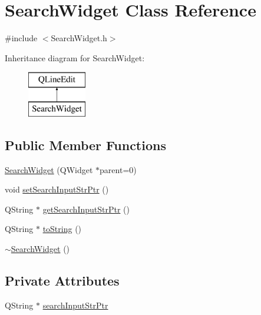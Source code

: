 \hypertarget{class_search_widget}{\section{Search\-Widget Class Reference}
\label{class_search_widget}
}


{\ttfamily \#include $<$Search\-Widget.\-h$>$}

Inheritance diagram for Search\-Widget\-:\begin{figure}[H]
\begin{center}
\leavevmode
\includegraphics[height=2.000000cm]{class_search_widget}
\end{center}
\end{figure}
\subsection*{Public Member Functions}
\begin{DoxyCompactItemize}
\item 
\hyperlink{class_search_widget_a5e9a6618a556149d58db62bb11514ff9}{Search\-Widget} (Q\-Widget $\ast$parent=0)
\item 
void \hyperlink{class_search_widget_a8f8b5f30cb03b79d6da02720a59fbd2b}{set\-Search\-Input\-Str\-Ptr} ()
\item 
Q\-String $\ast$ \hyperlink{class_search_widget_a6d832f61ea54365b2341ba6d9226c3ee}{get\-Search\-Input\-Str\-Ptr} ()
\item 
Q\-String $\ast$ \hyperlink{class_search_widget_ac5f22466b929a07287a5b81a375e459e}{to\-String} ()
\item 
\hyperlink{class_search_widget_a100ce22cd6ec4e52381851f0154dbe99}{$\sim$\-Search\-Widget} ()
\end{DoxyCompactItemize}
\subsection*{Private Attributes}
\begin{DoxyCompactItemize}
\item 
Q\-String $\ast$ \hyperlink{class_search_widget_a7862434baa0547c7f2280878b1fa79a3}{search\-Input\-Str\-Ptr}
\end{DoxyCompactItemize}


